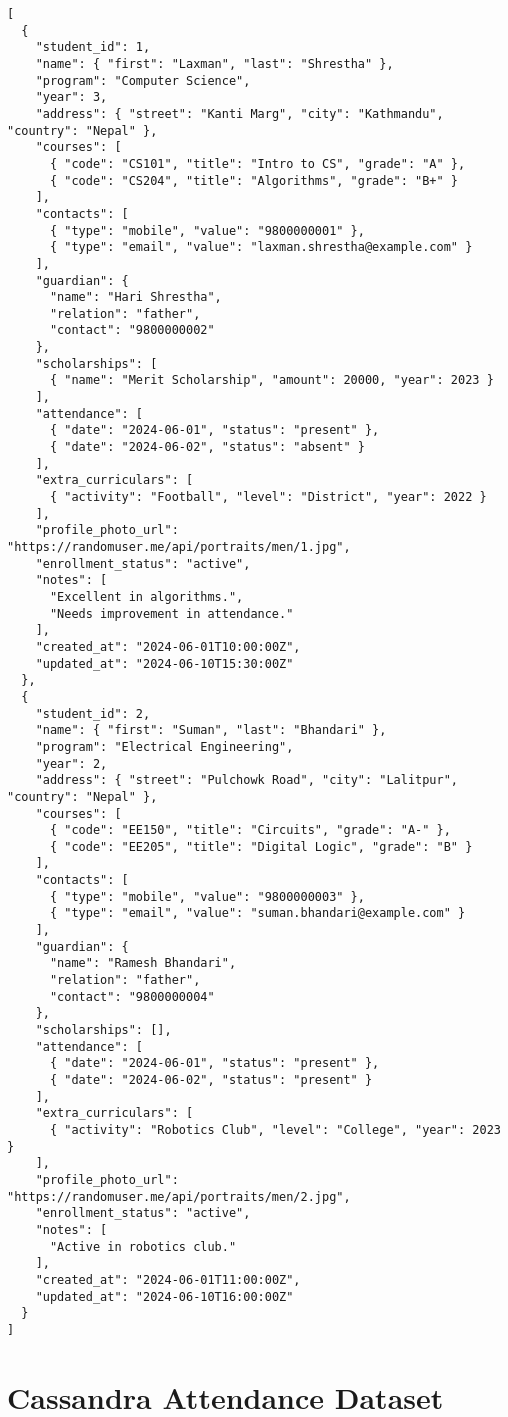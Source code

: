 \begin{verbatim}
[
  {
    "student_id": 1,
    "name": { "first": "Laxman", "last": "Shrestha" },
    "program": "Computer Science",
    "year": 3,
    "address": { "street": "Kanti Marg", "city": "Kathmandu", "country": "Nepal" },
    "courses": [
      { "code": "CS101", "title": "Intro to CS", "grade": "A" },
      { "code": "CS204", "title": "Algorithms", "grade": "B+" }
    ],
    "contacts": [
      { "type": "mobile", "value": "9800000001" },
      { "type": "email", "value": "laxman.shrestha@example.com" }
    ],
    "guardian": {
      "name": "Hari Shrestha",
      "relation": "father",
      "contact": "9800000002"
    },
    "scholarships": [
      { "name": "Merit Scholarship", "amount": 20000, "year": 2023 }
    ],
    "attendance": [
      { "date": "2024-06-01", "status": "present" },
      { "date": "2024-06-02", "status": "absent" }
    ],
    "extra_curriculars": [
      { "activity": "Football", "level": "District", "year": 2022 }
    ],
    "profile_photo_url": "https://randomuser.me/api/portraits/men/1.jpg",
    "enrollment_status": "active",
    "notes": [
      "Excellent in algorithms.",
      "Needs improvement in attendance."
    ],
    "created_at": "2024-06-01T10:00:00Z",
    "updated_at": "2024-06-10T15:30:00Z"
  },
  {
    "student_id": 2,
    "name": { "first": "Suman", "last": "Bhandari" },
    "program": "Electrical Engineering",
    "year": 2,
    "address": { "street": "Pulchowk Road", "city": "Lalitpur", "country": "Nepal" },
    "courses": [
      { "code": "EE150", "title": "Circuits", "grade": "A-" },
      { "code": "EE205", "title": "Digital Logic", "grade": "B" }
    ],
    "contacts": [
      { "type": "mobile", "value": "9800000003" },
      { "type": "email", "value": "suman.bhandari@example.com" }
    ],
    "guardian": {
      "name": "Ramesh Bhandari",
      "relation": "father",
      "contact": "9800000004"
    },
    "scholarships": [],
    "attendance": [
      { "date": "2024-06-01", "status": "present" },
      { "date": "2024-06-02", "status": "present" }
    ],
    "extra_curriculars": [
      { "activity": "Robotics Club", "level": "College", "year": 2023 }
    ],
    "profile_photo_url": "https://randomuser.me/api/portraits/men/2.jpg",
    "enrollment_status": "active",
    "notes": [
      "Active in robotics club."
    ],
    "created_at": "2024-06-01T11:00:00Z",
    "updated_at": "2024-06-10T16:00:00Z"
  }
]
\end{verbatim}

\section{Cassandra Attendance Dataset}


